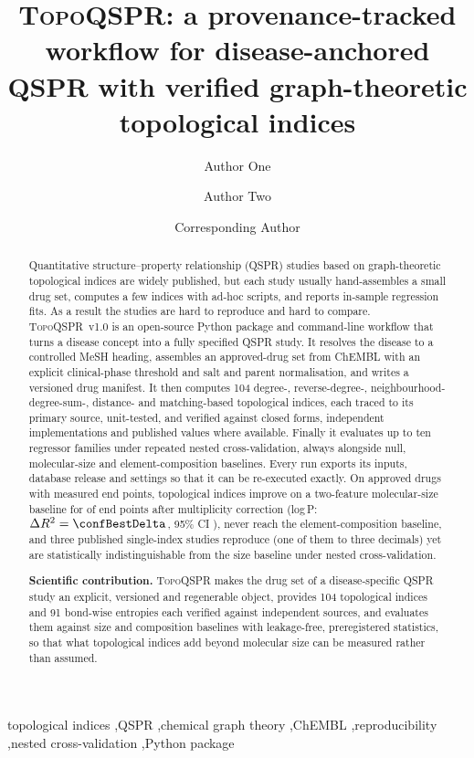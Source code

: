 \documentclass[preprint,12pt]{elsarticle}
\newcommand{\ml}{\textsc{TopoQSPR}}
\begin{document}
\begin{frontmatter}

\title{\ml: a provenance-tracked workflow for disease-anchored QSPR with verified graph-theoretic topological indices}

\author[a]{Author One}
\author[b]{Author Two}
\author[c]{Corresponding Author}

\begin{abstract}
Quantitative structure--property relationship (QSPR) studies based on graph-theoretic topological indices are widely published, but each study usually hand-assembles a small drug set, computes a few indices with ad-hoc scripts, and reports in-sample regression fits. As a result the studies are hard to reproduce and hard to compare. \ml{}~v1.0 is an open-source Python package and command-line workflow that turns a disease concept into a fully specified QSPR study. It resolves the disease to a controlled MeSH heading, assembles an approved-drug set from ChEMBL with an explicit clinical-phase threshold and salt and parent normalisation, and writes a versioned drug manifest. It then computes 104 degree-, reverse-degree-, neighbourhood-degree-sum-, distance- and matching-based topological indices, each traced to its primary source, unit-tested, and verified against closed forms, independent implementations and published values where available. Finally it evaluates up to ten regressor families under repeated nested cross-validation, always alongside null, molecular-size and element-composition baselines. Every run exports its inputs, database release and settings so that it can be re-executed exactly. On \nMolecules{} approved drugs with measured end points, topological indices improve on a two-feature molecular-size baseline for \confNInformative{} of \confNTargets{} end points after multiplicity correction (log\,P: $\Delta R^2=\confBestDelta$, 95\% CI \confBestCI), never reach the element-composition baseline, and three published single-index studies reproduce (one of them to three decimals) yet are statistically indistinguishable from the size baseline under nested cross-validation.

\textbf{Scientific contribution.} \ml{} makes the drug set of a disease-specific QSPR study an explicit, versioned and regenerable object, provides 104 topological indices and 91 bond-wise entropies each verified against independent sources, and evaluates them against size and composition baselines with leakage-free, preregistered statistics, so that what topological indices add beyond molecular size can be measured rather than assumed.
\end{abstract}

\begin{keyword}
topological indices \sep QSPR \sep chemical graph theory \sep ChEMBL \sep reproducibility \sep nested cross-validation \sep Python package
\end{keyword}
\end{frontmatter}
\end{document}
